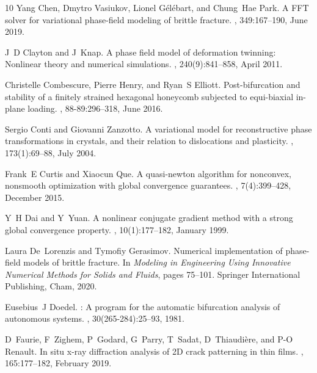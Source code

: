 \documentclass[10pt]{article}
\begin{document}
\begin{thebibliography}{10}
    Yang Chen, Dmytro Vasiukov, Lionel G{\'e}l{\'e}bart, and Chung~Hae Park.
    \newblock A {FFT} solver for variational phase-field modeling of brittle fracture.
    , 349:167--190, June 2019.

    J~D Clayton and J~Knap.
    \newblock A phase field model of deformation twinning: Nonlinear theory and numerical simulations.
    , 240(9):841--858, April 2011.

    Christelle Combescure, Pierre Henry, and Ryan~S Elliott.
    \newblock Post-bifurcation and stability of a finitely strained hexagonal honeycomb subjected to equi-biaxial in-plane loading.
    , 88-89:296--318, June 2016.

    Sergio Conti and Giovanni Zanzotto.
    \newblock A variational model for reconstructive phase transformations in crystals, and their relation to dislocations and plasticity.
    , 173(1):69--88, July 2004.

    Frank~E Curtis and Xiaocun Que.
    \newblock A quasi-newton algorithm for nonconvex, nonsmooth optimization with global convergence guarantees.
    , 7(4):399--428, December 2015.

    Y~H Dai and Y~Yuan.
    \newblock A nonlinear conjugate gradient method with a strong global convergence property.
    , 10(1):177--182, January 1999.

    Laura De~Lorenzis and Tymofiy Gerasimov.
    \newblock Numerical implementation of phase-field models of brittle fracture.
    \newblock In {\em Modeling in Engineering Using Innovative Numerical Methods for Solids and Fluids}, pages 75--101. Springer International Publishing, Cham, 2020.

    Eusebius~J Doedel.
    : A program for the automatic bifurcation analysis of autonomous systems.
    , 30(265-284):25--93, 1981.

    D~Faurie, F~Zighem, P~Godard, G~Parry, T~Sadat, D~Thiaudi{\`e}re, and P-O Renault.
    \newblock In situ x-ray diffraction analysis of {2D} crack patterning in thin films.
    , 165:177--182, February 2019.


\end{thebibliography}
\end{document}

